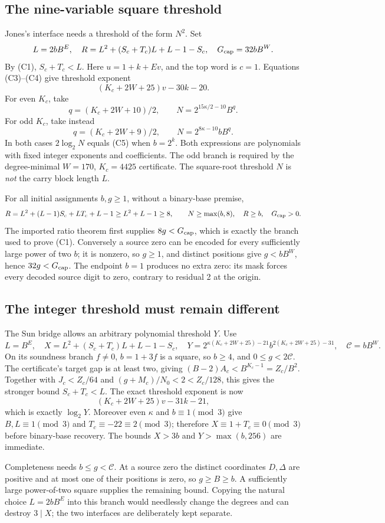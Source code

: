 \subsection{The nine-variable square threshold}
Jones's interface needs a threshold of the form $N^2$. Set
\[
 L=2bB^E,\quad R=L^2+(S_c+T_c)L+L-1-S_c,\quad
 G_{\rm cap}=32bB^W.
\]
By (C1), $S_c+T_c<L$. Here $u=1+k+Ev$, and the top word is $c=1$.
Equations (C3)--(C4) give threshold exponent
\[
             (K_c+2W+25)v-30k-20.                       \tag{C5}
\]
For even $K_c$, take
\[
 q=(K_c+2W+10)/2,\qquad N=2^{15\kappa/2-10}B^q.
\]
For odd $K_c$, take instead
\[
 q=(K_c+2W+9)/2,\qquad N=2^{8\kappa-10}bB^q.
\]
In both cases $2\log_2N$ equals (C5) when $b=2^k$. Both expressions are
polynomials with fixed integer exponents and coefficients. The odd branch
is required by the degree-minimal $W=170$, $K_c=4425$ certificate.
The square-root threshold $N$ is \emph{not} the carry block length $L$.

For all initial assignments $b,g\ge1$, without a binary-base premise,
\[
 R=L^2+(L-1)S_c+LT_c+L-1\ge L^2+L-1\ge8,
 \qquad N\ge\max(b,8),\quad R\ge b,\quad G_{\rm cap}>0.
\]
The imported ratio theorem first supplies $8g<G_{\rm cap}$, which is
exactly the branch used to prove (C1). Conversely a source zero can be
encoded for every sufficiently large power of two $b$; it is nonzero, so
$g\ge1$, and distinct positions give $g<bB^W$, hence $32g<G_{\rm cap}$.
The endpoint $b=1$ produces no extra zero: its mask forces every decoded
source digit to zero, contrary to residual 2 at the origin.

\subsection{The integer threshold must remain different}
The Sun bridge allows an arbitrary polynomial threshold $Y$. Use
\[
 L=B^E,\quad X=L^2+(S_c+T_c)L+L-1-S_c,\quad
 Y=2^{\kappa(K_c+2W+25)-21}b^{2(K_c+2W+25)-31},
 \quad\mathcal C=bB^W.
\]
On its soundness branch $f\ne0$, $b=1+3f$ is a square, so $b\ge4$,
and $0\le g<2\mathcal C$. The certificate's target gap is at least two,
giving $(B-2)A_c<B^{K_c-1}=Z_c/B^2$. Together with
$J_c<Z_c/64$ and $(g+M_c)/N_0<2<Z_c/128$, this gives the stronger bound
$S_c+T_c<L$. The exact threshold exponent is now
\[
 (K_c+2W+25)v-31k-21,
\]
which is exactly $\log_2Y$. Moreover even $\kappa$ and $b\equiv1\pmod3$
give $B,L\equiv1\pmod3$ and $T_c\equiv-22\equiv2\pmod3$;
therefore $X\equiv1+T_c\equiv0\pmod3$ before binary-base recovery.
The bounds $X>3b$ and $Y>\max(b,256)$ are immediate.

Completeness needs $b\le g<\mathcal C$. At a source zero the distinct
coordinates $D,\Delta$ are positive and at most one of their positions is
zero, so $g\ge B\ge b$. A sufficiently large power-of-two square supplies
the remaining bound. Copying the natural choice $L=2bB^E$ into this branch
would needlessly change the degrees and can destroy $3\mid X$; the two
interfaces are deliberately kept separate.
